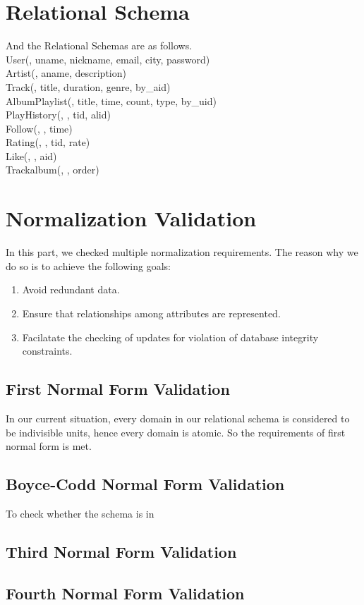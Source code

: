 \documentclass[letter, 12pt]{report}
\begin{document}
	\section{Relational Schema}
	And the Relational Schemas are as follows.\\
	User(\underline{}, uname, nickname, email, city, password)\\
	Artist(\underline{}, aname, description)\\
	Track(\underline{}, title, duration, genre, by\_aid)\\
	AlbumPlaylist(\underline{}, title, time, count, type, by\_uid)\\
	PlayHistory(\underline{}, \underline{}, tid, alid)\\
	Follow(\underline{}, \underline{}, time)\\
	Rating(\underline{}, \underline{}, tid, rate)\\
	Like(\underline{}, \underline{}, aid)\\
	Trackalbum(\underline{}, \underline{}, order)\\
	
	
	\section{Normalization Validation}
	In this part, we checked multiple normalization requirements. The reason why we do so is to achieve the following goals:
	\begin{enumerate}
		\item 
		Avoid redundant data.
		\item 
		Ensure that relationships among attributes are represented.
		\item 
		Facilatate the checking of updates for violation of database integrity constraints.
	\end{enumerate}
	\subsection{First Normal Form Validation}
	In our current situation, every domain in our relational schema is considered to be indivisible units, hence every domain is atomic. So the requirements of first normal form is met.
	\subsection{Boyce-Codd Normal Form Validation}
	To check whether the schema is in 
	\subsection{Third Normal Form Validation}
	\subsection{Fourth Normal Form Validation}
	
\end{document}
